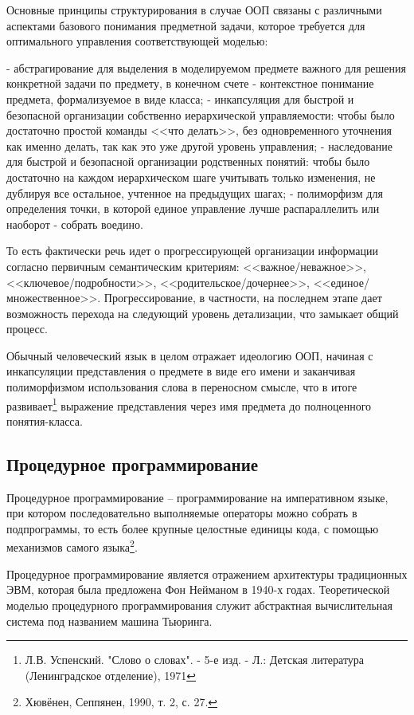 \documentclass[12pt, twoside]{report}
\begin{document}
Основные принципы структурирования в случае ООП связаны с различными аспектами базового понимания предметной задачи, которое требуется для оптимального управления соответствующей моделью:

- абстрагирование для выделения в моделируемом предмете важного для решения конкретной задачи по предмету, в конечном счете - контекстное понимание предмета, формализуемое в виде класса;
- инкапсуляция для быстрой и безопасной организации собственно иерархической управляемости: чтобы было достаточно простой команды <<что делать>>, без одновременного уточнения как именно делать, так как это уже другой уровень управления;
- наследование для быстрой и безопасной организации родственных понятий: чтобы было достаточно на каждом иерархическом шаге учитывать только изменения, не дублируя все остальное, учтенное на предыдущих шагах;
- полиморфизм для определения точки, в которой единое управление лучше распараллелить или наоборот - собрать воедино.

То есть фактически речь идет о прогрессирующей организации информации согласно первичным семантическим критериям: <<важное/неважное>>, <<ключевое/подробности>>, <<родительское/дочернее>>, <<единое/множественное>>. Прогрессирование, в частности, на последнем этапе дает возможность перехода на следующий уровень детализации, что замыкает общий процесс.

Обычный человеческий язык в целом отражает идеологию ООП, начиная с инкапсуляции представления о предмете в виде его имени и заканчивая полиморфизмом использования слова в переносном смысле, что в итоге развивает\footnote{Л.В. Успенский. "Слово о словах". - 5-е изд. - Л.: Детская литература (Ленинградское отделение), 1971} выражение представления через имя предмета до полноценного понятия-класса.

\subsection*{Процедурное программирование}

Процедурное программирование -- программирование на императивном языке, при котором последовательно выполняемые операторы можно собрать в подпрограммы, то есть более крупные целостные единицы кода, с помощью механизмов самого языка\footnote{Хювёнен, Сеппянен, 1990, т. 2, с. 27.}.

Процедурное программирование является отражением архитектуры традиционных ЭВМ, которая была предложена Фон Нейманом в 1940-х годах. Теоретической моделью процедурного программирования служит абстрактная вычислительная система под названием машина Тьюринга.
\end{document}
